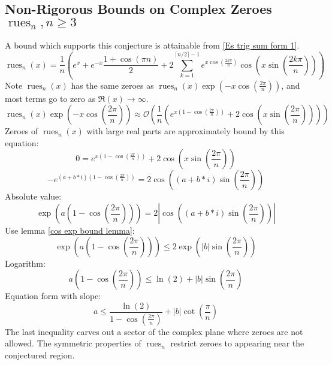 \documentclass[]{article}
\DeclareMathOperator{\rues}{rues}
\newcommand{\pqty}[1]{{\left(#1\right)}}
\newcommand{\abs}[1]{{\left\lvert#1\right\rvert}}
\numberwithin{equation}{section}
\begin{document}
	
	\subsection{Non-Rigorous Bounds on Complex Zeroes \(\rues_n, n\geq 3\)}
	A bound which supports this conjecture is attainable from \eqref{Es trig sum form 1}.
	\begin{equation}
	\rues_n\pqty{x}
	=
	\frac{1}{n}\pqty{
		e^x+e^{-x}\frac{1+\cos\pqty{\pi n}}{2} 
		+2\sum _{k=1}^{\lceil n/2\rceil-1}e^{x\cos\pqty{\frac{2k\pi}{n}}} \cos\pqty{x\sin\pqty{\frac{2k\pi}{n}}}
	}
	\end{equation}
	Note \(\rues_n\pqty{x}\) has the same zeroes as \(\rues_n\pqty{x}\exp\pqty{-x\cos\pqty{\frac{2\pi}{n}}}\), and most terms go to zero as \(\Re\pqty{x}\to\infty\).
	\begin{equation}
	\rues_n\pqty{x}\exp\pqty{-x\cos\pqty{\frac{2\pi}{n}}}
	\approx\mathcal{O}\pqty{
	\frac{1}{n}\pqty{
		e^{x\pqty{1-\cos\pqty{\frac{2\pi}{n}}}}
		+2 \cos\pqty{x\sin\pqty{\frac{2\pi}{n}}}}
	}
	\end{equation}
	Zeroes of \(\rues_n\pqty{x}\) with large real parts are approximately bound by this equation:
	\begin{equation}
		0=
		e^{x\pqty{1-\cos\pqty{\frac{2\pi}{n}}}}
		+2 \cos\pqty{x\sin\pqty{\frac{2\pi}{n}}}
	\end{equation}
	\begin{equation}
	-
	e^{\pqty{a+b*i}\pqty{1-\cos\pqty{\frac{2\pi}{n}}}}=
	2 \cos\pqty{\pqty{a+b*i}\sin\pqty{\frac{2\pi}{n}}}
	\end{equation}
	Absolute value:
	\begin{equation}
	\exp\pqty{a\pqty{1-\cos\pqty{\frac{2\pi}{n}}}}=
	2 \abs{\cos\pqty{\pqty{a+b*i}\sin\pqty{\frac{2\pi}{n}}}}
	\end{equation}
	Use lemma \eqref{cos exp bound lemma}:
	\begin{equation}
	\exp\pqty{a\pqty{1-\cos\pqty{\frac{2\pi}{n}}}}\leq
	2 \exp\pqty{\abs{b}\sin\pqty{\frac{2\pi}{n}}}
	\end{equation}
	Logarithm:
	\begin{equation}
	{a\pqty{1-\cos\pqty{\frac{2\pi}{n}}}}\leq
	\ln\pqty{2} + {\abs{b}\sin\pqty{\frac{2\pi}{n}}}
	\end{equation}
	Equation form with slope:
	\begin{equation}
	{a\leq
	\frac{\ln\pqty{2}}{{1-\cos\pqty{\frac{2\pi}{n}}}}} + {\abs{b}\cot\pqty{\frac{\pi}{n}}}
	\end{equation}
	The last inequality carves out a sector of the complex plane where zeroes are not allowed. The symmetric properties of \(\rues_n\) restrict zeroes to appearing near the conjectured region.
	
\end{document}
